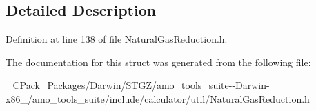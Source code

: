 \subsection{Detailed Description}


Definition at line 138 of file Natural\+Gas\+Reduction.\+h.



The documentation for this struct was generated from the following file\+:\begin{DoxyCompactItemize}
\item 
\+\_\+\+C\+Pack\+\_\+\+Packages/\+Darwin/\+S\+T\+G\+Z/amo\+\_\+tools\+\_\+suite-\/-\/\+Darwin-\/x86\+\_/amo\+\_\+tools\+\_\+suite/include/calculator/util/Natural\+Gas\+Reduction.\+h\end{DoxyCompactItemize}
